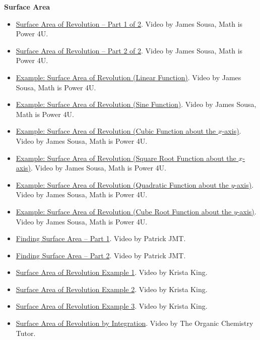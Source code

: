 \medskip

\textbf{Surface Area}

\begin{itemize}

\item \href{https://youtu.be/4XLq-BWK5NY}{Surface Area of Revolution – Part 1 of 2}.  
Video by James Sousa, Math is Power 4U.

\item \href{https://youtu.be/u-kEdDCno44}{Surface Area of Revolution – Part 2 of 2}.  
Video by James Sousa, Math is Power 4U.

\item \href{https://www.youtube.com/watch?v=nRWNLlsziN4}{Example: Surface Area of Revolution (Linear Function)}.  
Video by James Sousa, Math is Power 4U.

\item \href{https://www.youtube.com/watch?v=hvOC6u26yK4}{Example: Surface Area of Revolution (Sine Function)}.  
Video by James Sousa, Math is Power 4U.

\item \href{https://www.youtube.com/watch?v=csWPkm-gJ8E}{Example: Surface Area of Revolution (Cubic Function about the $x$-axis)}.  
Video by James Sousa, Math is Power 4U.

\item \href{https://www.youtube.com/watch?v=NA1PpNLVGzw}{Example: Surface Area of Revolution (Square Root Function about the $x$-axis)}.  
Video by James Sousa, Math is Power 4U.

\item \href{https://www.youtube.com/watch?v=lZ9cEnagXBw}{Example: Surface Area of Revolution (Quadratic Function about the $y$-axis)}.  
Video by James Sousa, Math is Power 4U.

\item \href{https://www.youtube.com/watch?v=hGjaiwcEO9E}{Example: Surface Area of Revolution (Cube Root Function about the $y$-axis)}.  
Video by James Sousa, Math is Power 4U.

\item \href{https://youtu.be/-j2eKo84Ef8}{Finding Surface Area – Part 1}.  
Video by Patrick JMT.

\item \href{https://youtu.be/Jxf_XeKsiyY}{Finding Surface Area – Part 2}.  
Video by Patrick JMT.

\item \href{https://youtu.be/WlaFF-OgwJM}{Surface Area of Revolution Example 1}.  
Video by Krista King.

\item \href{https://youtu.be/VdDitAOifsY}{Surface Area of Revolution Example 2}.  
Video by Krista King.

\item \href{https://youtu.be/2fhKcatexdw}{Surface Area of Revolution Example 3}.  
Video by Krista King.

\item \href{https://youtu.be/lQM-0Nqs9Pg}{Surface Area of Revolution by Integration}.  
Video by The Organic Chemistry Tutor.

\end{itemize}

